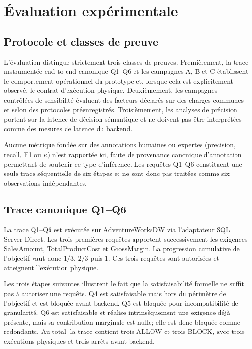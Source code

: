 \section{Évaluation expérimentale}
\label{sec:evaluation-experimentale}
\label{sec:exp}
\label{sec:experiments}

\subsection{Protocole et classes de preuve}

L'évaluation distingue strictement trois classes de preuves.
Premièrement, la trace instrumentée end-to-end canonique Q1--Q6 et
les campagnes A, B et C établissent le comportement opérationnel du
prototype et, lorsque cela est explicitement observé, le contrat
d'exécution physique. Deuxièmement, les campagnes contrôlées de
sensibilité évaluent des facteurs déclarés sur des charges communes
et selon des protocoles préenregistrés. Troisièmement, les analyses de
précision portent sur la latence de décision sémantique et ne doivent
pas être interprétées comme des mesures de latence du backend.

Aucune métrique fondée sur des annotations humaines ou expertes
(precision, recall, F1 ou $\kappa$) n'est rapportée ici, faute de
provenance canonique d'annotation permettant de soutenir ce type
d'inférence. Les requêtes Q1--Q6 constituent une seule trace
séquentielle de six étapes et ne sont donc pas traitées comme six
observations indépendantes.

\subsection{Trace canonique Q1--Q6}

La trace Q1--Q6 est exécutée sur AdventureWorksDW via l'adaptateur
SQL Server Direct. Les trois premières requêtes apportent
successivement les exigences SalesAmount, TotalProductCost et
GrossMargin. La progression cumulative de l'objectif vaut donc
$1/3$, $2/3$ puis $1$. Ces trois requêtes sont autorisées et atteignent
l'exécution physique.

Les trois étapes suivantes illustrent le fait que la satisfaisabilité
formelle ne suffit pas à autoriser une requête. Q4 est satisfaisable
mais hors du périmètre de l'objectif et est bloquée avant backend. Q5
est bloquée pour incompatibilité de granularité. Q6 est satisfaisable
et réalise intrinsèquement une exigence déjà présente, mais sa
contribution marginale est nulle; elle est donc bloquée comme
redondante. Au total, la trace contient trois ALLOW et trois BLOCK,
avec trois exécutions physiques et trois arrêts avant backend.

